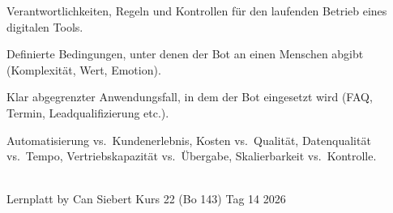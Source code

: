 \documentclass[11pt,a4paper,oneside]{article}
\begin{document}
\begin{description}[style=nextline,leftmargin=0pt,labelindent=0pt,itemsep=4pt]
  \item[Tool-Governance] Verantwortlichkeiten, Regeln und Kontrollen für den laufenden Betrieb eines digitalen Tools.
  \item[Übergaberegel] Definierte Bedingungen, unter denen der Bot an einen Menschen abgibt (Komplexität, Wert, Emotion).
  \item[Use Case] Klar abgegrenzter Anwendungsfall, in dem der Bot eingesetzt wird (FAQ, Termin, Leadqualifizierung etc.).
  \item[Zielkonflikte (Bot)] Automatisierung vs.\ Kundenerlebnis, Kosten vs.\ Qualität, Datenqualität vs.\ Tempo, Vertriebskapazität vs.\ Übergabe, Skalierbarkeit vs.\ Kontrolle.
\end{description}

\vspace{1cm}
\noindent{\color{lpAccent}\rule{\linewidth}{0.6pt}}\\[4pt]
{\footnotesize\sffamily\color{lpGray}Lernplatt \textperiodcentered{} by Can Siebert \textperiodcentered{} Kurs 22 (Bo 143) \textperiodcentered{} Tag 14 \textperiodcentered{} \textcopyright{} 2026}
\end{document}
